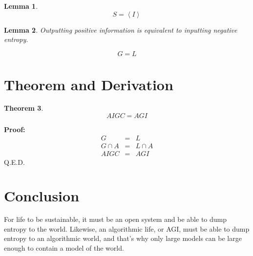 \documentclass[12pt,amsmath,amsfonts,twocolumn]{revtex4-1}
\newtheorem{thm}{Theorem}[section]
\newtheorem{lem}[thm]{Lemma}
\numberwithin{equation}{section}
\begin{document}
\begin{lem}
\begin{equation}
S=\left\langle I \right\rangle 
\end{equation}
\end{lem}


\begin{lem}

Outputting positive information is equivalent to inputting negative entropy.

\begin{equation}
G = L
\end{equation}
\end{lem}
\section{Theorem and Derivation}
\begin{thm}
\begin{equation}
AIGC=AGI
\end{equation}
\end{thm}
\textbf{Proof:}
\begin{eqnarray}
G&=&L\\
G \cap A &=& L \cap A\\
AIGC &=& AGI
\end{eqnarray}
Q.E.D.
\section{Conclusion}
For life to be sustainable, it must be an open system and be able to dump entropy to the world. Likewise, an algorithmic life, or AGI, must be able to dump entropy to an algorithmic world\cite{worldModel}, and that's why only large models can be large enough to contain a model of the world. 


\end{document}

